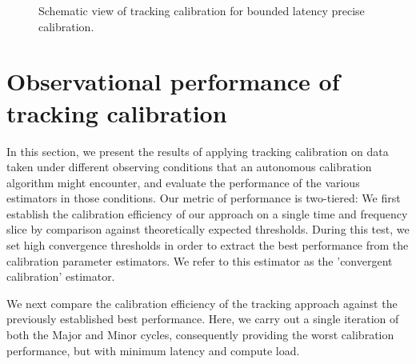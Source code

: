\documentclass{aa}
\begin{document}
\begin{figure}[tbh]

\caption{\label{fig:trackcalSchematic}Schematic view of tracking calibration
for bounded latency precise calibration.}
\end{figure}

\section{\label{sec:Performance-of-tracking}Observational performance of tracking calibration}


In this section, we present the results of applying tracking calibration on data
taken  under  different  observing  conditions that  an  autonomous  calibration
algorithm  might  encounter,  and   evaluate  the  performance  of  the  various
estimators in  those conditions.   Our metric of  performance is  two-tiered: We
first establish the calibration efficiency of  our approach on a single time and
frequency slice by comparison  against theoretically expected thresholds. During
this  test, we  set high  convergence thresholds  in order  to extract  the best
performance  from  the  calibration  parameter  estimators.  We  refer  to  this
estimator as the 'convergent calibration' estimator.

We next compare the calibration  efficiency of the tracking approach against the
previously established best  performance. Here, we carry out  a single iteration
of both the Major and Minor cycles, consequently providing the worst calibration
performance,   but  with   minimum  latency   and  compute   load.
\end{document}
